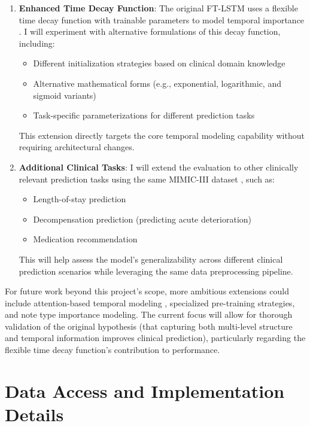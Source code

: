 \documentclass[10pt,letterpaper,twocolumn]{article}
\begin{document}
\begin{enumerate}[leftmargin=*]
    \item \textbf{Enhanced Time Decay Function}: The original FT-LSTM uses a flexible time decay function with trainable parameters to model temporal importance \cite{zhang2020time}. I will experiment with alternative formulations of this decay function, including:
    \begin{itemize}[leftmargin=*, itemsep=1pt, parsep=1pt, topsep=1pt]
        \item Different initialization strategies based on clinical domain knowledge
        \item Alternative mathematical forms (e.g., exponential, logarithmic, and sigmoid variants)
        \item Task-specific parameterizations for different prediction tasks
    \end{itemize}
    This extension directly targets the core temporal modeling capability without requiring architectural changes.
    
    \item \textbf{Additional Clinical Tasks}: I will extend the evaluation to other clinically relevant prediction tasks using the same MIMIC-III dataset \cite{johnson2016mimic}, such as:
    \begin{itemize}[leftmargin=*, itemsep=1pt, parsep=1pt, topsep=1pt]
        \item Length-of-stay prediction
        \item Decompensation prediction (predicting acute deterioration)
        \item Medication recommendation
    \end{itemize}
    This will help assess the model's generalizability across different clinical prediction scenarios while leveraging the same data preprocessing pipeline.
\end{enumerate}

For future work beyond this project's scope, more ambitious extensions could include attention-based temporal modeling \cite{vaswani2017attention}, specialized pre-training strategies, and note type importance modeling. The current focus will allow for thorough validation of the original hypothesis (that capturing both multi-level structure and temporal information improves clinical prediction), particularly regarding the flexible time decay function's contribution to performance.

\section{Data Access and Implementation Details}
\end{document}
